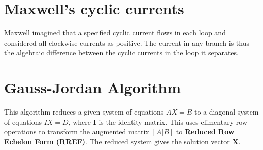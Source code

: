 \documentclass{article}
\begin{document}
\section{Maxwell's cyclic currents}
Maxwell imagined that a specified cyclic current flows in each loop and considered all clockwise currents as positive. The current in any branch is thus the algebraic difference between the cyclic currents in the loop it separates.

\section{Gauss-Jordan Algorithm}
This algorithm reduces a given system of equations $AX=B$ to a diagonal system of equations $IX=D$, where \textbf{I} is the identity matrix. This uses elimentary row operations to transform the augmented matrix $[A \vert B]$ to \textbf{Reduced Row Echelon Form (RREF)}. The reduced system gives the solution vector \textbf{X}.
\end{document}
